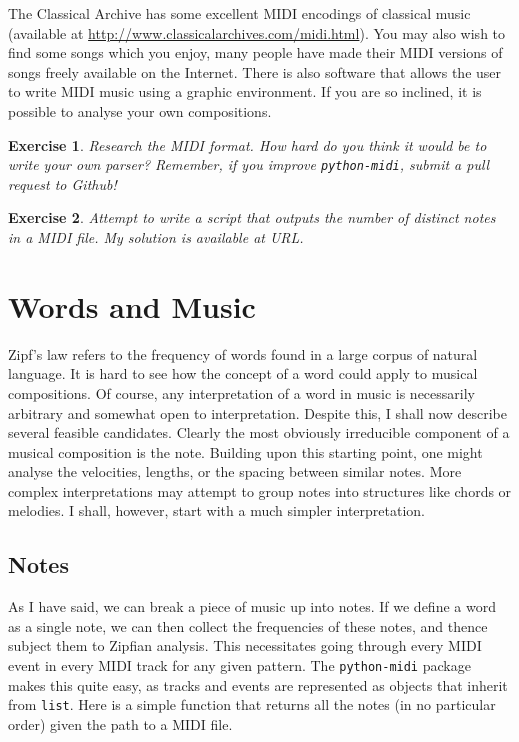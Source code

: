 \documentclass[10pt]{book}
\newtheorem{exercise}{Exercise}[chapter]
\begin{document}
The Classical Archive has some excellent MIDI encodings of classical music (available at \url{http://www.classicalarchives.com/midi.html}). You may also wish to find some songs which you enjoy, many people have made their MIDI versions of songs freely available on the Internet. There is also software that allows the user to write MIDI music using a graphic environment. If you are so inclined, it is possible to analyse your own compositions.


\begin{exercise}
Research the MIDI format. How hard do you think it would be to write your own parser? Remember, if you improve \texttt{python-midi}, submit a pull request to Github!
\end{exercise}

\begin{exercise}
Attempt to write a script that outputs the number of distinct notes in a MIDI file. My solution is available at URL.
\end{exercise}


\section{Words and Music}

Zipf's law refers to the frequency of words found in a large corpus of natural language. It is hard to see how the concept of a word could apply to musical compositions. Of course, any interpretation of a word in music is necessarily arbitrary and somewhat open to interpretation. Despite this, I shall now describe several feasible candidates. Clearly the most obviously irreducible component of a musical composition is the note. Building upon this starting point, one might analyse the velocities, lengths, or the spacing between similar notes. More complex interpretations may attempt to group notes into structures like chords or melodies. I shall, however, start with a much simpler interpretation.

\subsection{Notes}
\label{sec:note_group}
As I have said, we can break a piece of music up into notes. If we define a word as a single note, we can then collect the frequencies of these notes, and thence subject them to Zipfian analysis. This necessitates going through every MIDI event in every MIDI track for any given pattern. The \texttt{python-midi} package makes this quite easy, as tracks and events are represented as objects that inherit from \texttt{list}. Here is a simple function that returns all the notes (in no particular order) given the path to a MIDI file.
\end{document}
